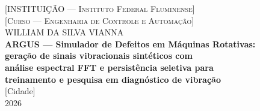 \begin{titlingpage}
\thispagestyle{empty}
\begin{center}

{\large \textsc{[INSTITUI\c{C}\~AO — Instituto Federal Fluminense]}}\\[0.4cm]
{\large \textsc{[Curso — Engenharia de Controle e Automa\c{c}\~ao]}}\\[4.5cm]

{\large WILLIAM DA SILVA VIANNA}\\[3.5cm]

{\Large\bfseries ARGUS --- Simulador de Defeitos em M\'aquinas Rotativas:}\\[0.3cm]
{\Large\bfseries gera\c{c}\~ao de sinais vibracionais sint\'eticos com}\\[0.3cm]
{\Large\bfseries an\'alise espectral FFT e persist\^encia seletiva para}\\[0.3cm]
{\Large\bfseries treinamento e pesquisa em diagn\'ostico de vibra\c{c}\~ao}\\[5.5cm]

{\large [Cidade]}\\[0.4cm]
{\large 2026}

\end{center}
\end{titlingpage}
